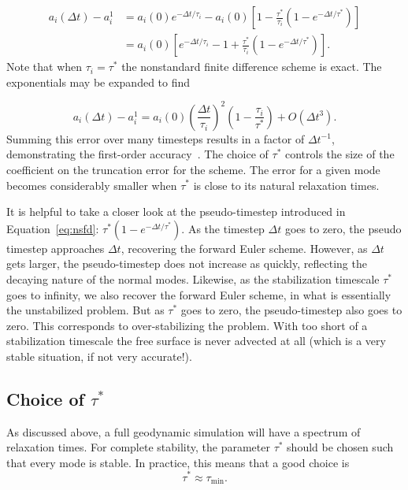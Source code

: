 \documentclass[preprint,12pt,authoryear]{elsarticle}
\newif\ifdetail
\begin{document}
\begin{equation}
\begin{aligned}
a_i(\Delta t) - a_i^{1} &= a_i(0) e^{-\Delta t/\tau_i} - a_i{(0)} \left[ 1 - \frac{\tau^*}{\tau_i} \left(1-e^{-\Delta t/\tau^*} \right) \right] \\
                        &= a_i{(0)} \left[ e^{-\Delta t/\tau_i} - 1 + \frac{\tau^*}{\tau_i} \left(1-e^{-\Delta t/\tau^*} \right) \right].
\end{aligned}
\end{equation}
Note that when $\tau_i = \tau^*$ the nonstandard finite difference scheme is exact.
The exponentials may be expanded to find
\ifdetail
\begin{equation}
a_i(\Delta t) - a_i^{1} = - a_i{(0)} \left[ \left(\frac{\Delta t}{\tau_i}\right)^2 - \frac{\tau^*}{\tau_i} \left(\frac{\Delta t }{\tau^* }\right)^2 \right].
\end{equation}
\fi
\begin{equation}
a_i(\Delta t) - a_i^{1} = {a_i{(0)} } \left( \frac{\Delta t}{\tau_i} \right)^2 \left( 1 - \frac{\tau_i}{\tau^*} \right) + O(\Delta t^3).
\end{equation}
Summing this error over many timesteps results in a factor of $\Delta t^{-1}$, demonstrating the first-order accuracy~\citep[e.g.]{leveque2007finite}.
The choice of $\tau^*$ controls the size of the coefficient on the truncation error for the scheme.
The error for a given mode becomes considerably smaller when $\tau^*$ is close to its natural relaxation times.

It is helpful to take a closer look at the pseudo-timestep introduced in Equation~\eqref{eq:nsfd}: $\tau^*(1-e^{-\Delta t/\tau^*})$.
As the timestep $\Delta t$ goes to zero, the pseudo timestep approaches $\Delta t$, recovering 
the forward Euler scheme. However, as $\Delta t$ gets larger, the pseudo-timestep does not 
increase as quickly, reflecting the decaying nature of the normal modes.
Likewise, as the stabilization timescale $\tau^*$ goes to infinity, we also recover the 
forward Euler scheme, in what is essentially the unstabilized problem. But as $\tau^*$
goes to zero, the pseudo-timestep also goes to zero. This corresponds to over-stabilizing the
problem. With too short of a stabilization timescale the free surface is never advected 
at all (which is a very stable situation, if not very accurate!).

\subsection{Choice of $\tau^*$}
As discussed above, a full geodynamic simulation will have a spectrum of relaxation times.
For complete stability, the parameter $\tau^*$ should be chosen such that every mode is stable.
In practice, this means that a good choice is 
\begin{equation}
\tau^* \approx \tau_{\mathrm{min}}.
\label{eq:tau_choice}
\end{equation}
\end{document}
